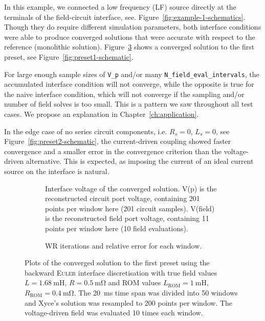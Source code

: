\begin{example}[LF sources] %
    In this example, we connected a low frequency (LF) source directly at the terminals of the field-circuit interface, see. Figure~\ref{fig:example-1-schematics}. Though they do require different simulation parameters, both interface conditions were able to produce converged solutions that were accurate with respect to the reference (monolithic solution). Figure~\ref{fig:example-1-plots} shows a converged solution to the first preset, see Figure~\ref{fig:preset1-schematic}.
    
    For large enough sample sizes of \lstinline|V_p| and/or many \lstinline|N_field_eval_intervals|, the accumulated interface condition will not converge, while the opposite is true for the naive interface condition, which will not converge if the sampling and/or number of field solves is too small. This is a pattern we saw throughout all test cases. We propose an explanation in Chapter~\ref{ch:application}.
    
    In the edge case of no series circuit components, i.e. $R_s = 0$, $L_s = 0$, see Figure~\ref{fig:preset2-schematic}, the current-driven coupling showed faster convergence and a smaller error in the convergence criterion than the voltage-driven alternative. This is expected, as imposing the current of an ideal current source on the interface is natural.
\end{example}

\begin{figure}
  \centering
  \begin{subfigure}[b]{0.7\textwidth}
    \centering
    
    \caption{Interface voltage of the converged solution. V(p) is the reconstructed circuit port voltage, containing 201 points per window here (201 circuit samples). V(field) is the reconstructed field port voltage, containing 11 points per window here (10 field evaluations).}
    \label{fig:example-1-plot-voltage}
  \end{subfigure}

  \vspace{1em}

  \begin{subfigure}[b]{0.7\textwidth}
    \centering
    
    \caption{WR iterations and relative error for each window.}
    \label{fig:example-1-plot-convergence}
  \end{subfigure}
  \caption{Plots of the converged solution to the first preset using the  backward \textsc{Euler} interface discretisation with true field values $L=\qty{1.68}{\milli\henry}$, $R=\qty{0.5}{\milli\ohm}$ and ROM values $L_{\text{ROM}}=\qty{1}{\milli\henry}$, $R_{\text{ROM}}=\qty{0.4}{\milli\ohm}$. The \qty{20}{\milli\second} time span was divided into 50 windows and Xyce's solution was resampled to 200 points per window. The voltage-driven field was evaluated 10 times each window.}
  \label{fig:example-1-plots}
\end{figure}

